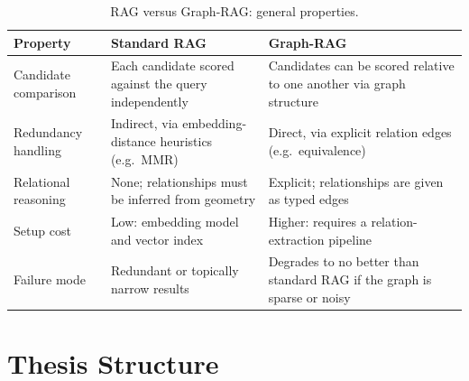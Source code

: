 \begin{table}[ht]
\centering
\caption{RAG versus Graph-RAG: general properties.}
\label{tab:rag-vs-graphrag}
\begin{tabularx}{\linewidth}{@{}l X X@{}}
\toprule
\textbf{Property} & \textbf{Standard RAG} & \textbf{Graph-RAG} \\
\midrule
Candidate comparison & Each candidate scored against the query independently & Candidates can be scored relative to one another via graph structure \\
Redundancy handling & Indirect, via embedding-distance heuristics (e.g.\ MMR) & Direct, via explicit relation edges (e.g.\ equivalence) \\
Relational reasoning & None; relationships must be inferred from geometry & Explicit; relationships are given as typed edges \\
Setup cost & Low: embedding model and vector index & Higher: requires a relation-extraction pipeline \\
Failure mode & Redundant or topically narrow results & Degrades to no better than standard RAG if the graph is sparse or noisy \\
\bottomrule
\end{tabularx}
\end{table}

\section{Thesis Structure}